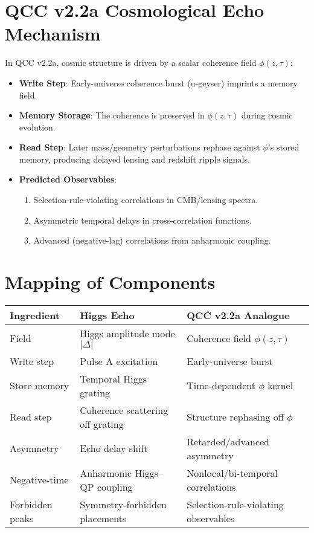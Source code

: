 \documentclass[12pt]{article}
\begin{document}
\section{QCC v2.2a Cosmological Echo Mechanism}
In QCC v2.2a, cosmic structure is driven by a scalar coherence field $\phi(z,\tau)$:

\begin{itemize}
    \item \textbf{Write Step}: Early-universe coherence burst (u-geyser) imprints a memory field.
    \item \textbf{Memory Storage}: The coherence is preserved in $\phi(z,\tau)$ during cosmic evolution.
    \item \textbf{Read Step}: Later mass/geometry perturbations rephase against $\phi$'s stored memory, producing delayed lensing and redshift ripple signals.
    \item \textbf{Predicted Observables}:
    \begin{enumerate}
        \item Selection-rule-violating correlations in CMB/lensing spectra.
        \item Asymmetric temporal delays in cross-correlation functions.
        \item Advanced (negative-lag) correlations from anharmonic coupling.
    \end{enumerate}
\end{itemize}

\section{Mapping of Components}
\begin{center}
\begin{tabular}{|l|l|l|}
\hline
\textbf{Ingredient} & \textbf{Higgs Echo} & \textbf{QCC v2.2a Analogue} \\
\hline
Field & Higgs amplitude mode $|\Delta|$ & Coherence field $\phi(z,\tau)$ \\
Write step & Pulse A excitation & Early-universe burst \\
Store memory & Temporal Higgs grating & Time-dependent $\phi$ kernel \\
Read step & Coherence scattering off grating & Structure rephasing off $\phi$ \\
Asymmetry & Echo delay shift & Retarded/advanced asymmetry \\
Negative-time & Anharmonic Higgs--QP coupling & Nonlocal/bi-temporal correlations \\
Forbidden peaks & Symmetry-forbidden placements & Selection-rule-violating observables \\
\hline
\end{tabular}
\end{center}
\end{document}
